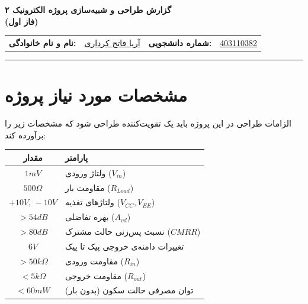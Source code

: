 \documentclass[12pt,a4paper]{article}
\begin{document}
\begin{center}
    \vspace*{0.5cm}
    {\huge \textbf{\textcolor{SharifDark}{گزارش طراحی و شبیه‌سازی پروژه الکترونیک ۲\\(فاز اول)}}} \\
    \vspace{0.5cm}
    \begin{tabular}{r l r l}
        \textbf{نام و نام خانوادگی:} & \underline{ آریا فاتح کرداری} & \textbf{شماره دانشجویی:} & \underline{403110382} \\
    \end{tabular}
    \vspace{1cm}
    \hrule
\end{center}

\vspace{0.5cm}

\section{مشخصات مورد نیاز پروژه}

\begin{taskbox}{الزامات طراحی}
در این پروژه باید یک تقویت‌کننده طراحی شود که مشخصات زیر را برآورده کند:
\begin{center}
\begin{tabular}{c l}
\toprule
\textbf{مقدار} & \textbf{پارامتر} \\
\midrule
$1mV$ & ولتاژ ورودی ($V_{in}$) \\
$500\Omega$ & مقاومت بار ($R_{Load}$) \\
$+10V,\,-10V$ & ولتاژهای تغذیه ($V_{CC},V_{EE}$) \\
$>54dB$ & بهره تفاضلی ($A_{vd}$) \\
$>80dB$ & نسبت پس‌زنی حالت مشترک ($CMRR$) \\
$6V$ & تغییرات دامنه‌ی خروجی پیک تا پیک \\
$>50k\Omega$ & مقاومت ورودی ($R_{in}$) \\
$<5k\Omega$ & مقاومت خروجی ($R_{out}$) \\
$<60mW$ & توان مصرفی حالت سکون (بدون بار) \\
\bottomrule
\end{tabular}
\end{center}
\end{taskbox}
\end{document}
